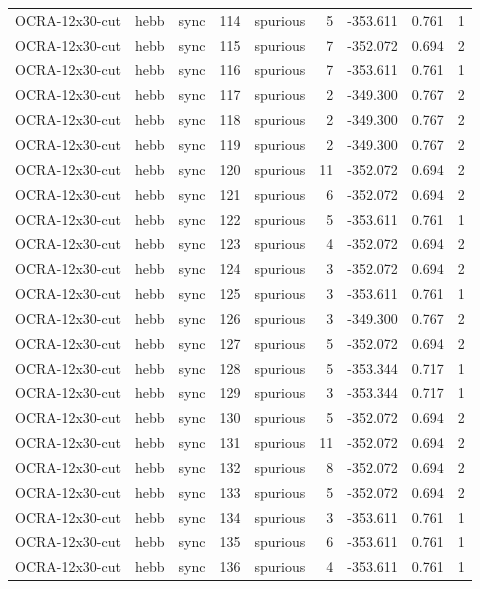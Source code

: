 \begin{tabular}{lllrlrrrr}
OCRA-12x30-cut & hebb & sync & 114 & spurious & 5 & -353.611 & 0.761 & 1 \\
OCRA-12x30-cut & hebb & sync & 115 & spurious & 7 & -352.072 & 0.694 & 2 \\
OCRA-12x30-cut & hebb & sync & 116 & spurious & 7 & -353.611 & 0.761 & 1 \\
OCRA-12x30-cut & hebb & sync & 117 & spurious & 2 & -349.300 & 0.767 & 2 \\
OCRA-12x30-cut & hebb & sync & 118 & spurious & 2 & -349.300 & 0.767 & 2 \\
OCRA-12x30-cut & hebb & sync & 119 & spurious & 2 & -349.300 & 0.767 & 2 \\
OCRA-12x30-cut & hebb & sync & 120 & spurious & 11 & -352.072 & 0.694 & 2 \\
OCRA-12x30-cut & hebb & sync & 121 & spurious & 6 & -352.072 & 0.694 & 2 \\
OCRA-12x30-cut & hebb & sync & 122 & spurious & 5 & -353.611 & 0.761 & 1 \\
OCRA-12x30-cut & hebb & sync & 123 & spurious & 4 & -352.072 & 0.694 & 2 \\
OCRA-12x30-cut & hebb & sync & 124 & spurious & 3 & -352.072 & 0.694 & 2 \\
OCRA-12x30-cut & hebb & sync & 125 & spurious & 3 & -353.611 & 0.761 & 1 \\
OCRA-12x30-cut & hebb & sync & 126 & spurious & 3 & -349.300 & 0.767 & 2 \\
OCRA-12x30-cut & hebb & sync & 127 & spurious & 5 & -352.072 & 0.694 & 2 \\
OCRA-12x30-cut & hebb & sync & 128 & spurious & 5 & -353.344 & 0.717 & 1 \\
OCRA-12x30-cut & hebb & sync & 129 & spurious & 3 & -353.344 & 0.717 & 1 \\
OCRA-12x30-cut & hebb & sync & 130 & spurious & 5 & -352.072 & 0.694 & 2 \\
OCRA-12x30-cut & hebb & sync & 131 & spurious & 11 & -352.072 & 0.694 & 2 \\
OCRA-12x30-cut & hebb & sync & 132 & spurious & 8 & -352.072 & 0.694 & 2 \\
OCRA-12x30-cut & hebb & sync & 133 & spurious & 5 & -352.072 & 0.694 & 2 \\
OCRA-12x30-cut & hebb & sync & 134 & spurious & 3 & -353.611 & 0.761 & 1 \\
OCRA-12x30-cut & hebb & sync & 135 & spurious & 6 & -353.611 & 0.761 & 1 \\
OCRA-12x30-cut & hebb & sync & 136 & spurious & 4 & -353.611 & 0.761 & 1 \\

\end{tabular}

